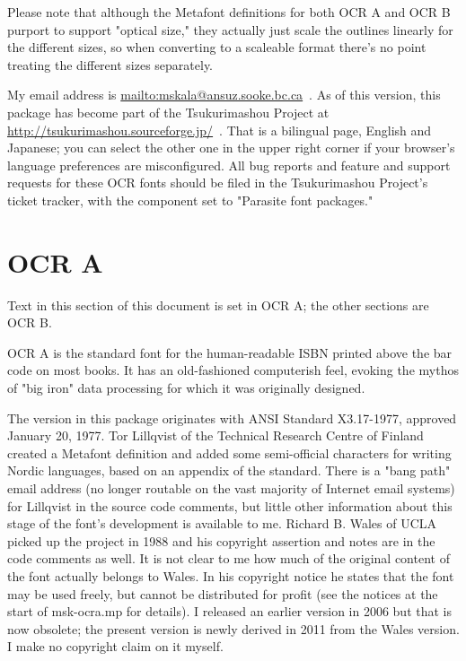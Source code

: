 \documentclass{article}
\begin{document}
Please note that although the Metafont definitions for both OCR A and OCR B
purport to support "optical size," they actually just scale the outlines
linearly for the different sizes, so when converting to a scaleable format
there's no point treating the different sizes separately.

My email address is \url{mailto:mskala@ansuz.sooke.bc.ca}~.  As of this
version, this package has become part of the Tsukurimashou Project at
\url{http://tsukurimashou.sourceforge.jp/}~.  That is a bilingual page,
English and Japanese; you can select the other one in the upper right corner
if your browser's language preferences are misconfigured.  All bug reports
and feature and support requests for these OCR fonts should be filed in the
Tsukurimashou Project's ticket tracker, with the component set to "Parasite
font packages."

\setmainfont{OCRA.otf}
\setmonofont{OCRA.otf}
\section{OCR A}

Text in this section of this document is set in OCR A; the other sections
are OCR B.

OCR A is the standard font for the human-readable ISBN printed above the bar
code on most books.  It has an old-fashioned computerish feel, evoking the
mythos of "big iron" data processing for which it was originally designed.

The version in this package originates with ANSI Standard X3.17-1977,
approved January 20, 1977.  Tor Lillqvist of the Technical Research Centre
of Finland created a Metafont definition and added some semi-official
characters for writing Nordic languages, based on an appendix of the
standard.  There is a "bang path" email address (no longer routable on the
vast majority of Internet email systems) for Lillqvist in the source code
comments, but little other information about this stage of the font's
development is available to me.  Richard B. Wales of UCLA picked up the
project in 1988 and his copyright assertion and notes are in the code
comments as well.  It is not clear to me how much of the original content of
the font actually belongs to Wales.  In his copyright notice he states that
the font may be used freely, but cannot be distributed for profit (see the
notices at the start of msk-ocra.mp for details).
I released an earlier version in 2006
but that is now obsolete; the present version is newly derived in 2011 from
the Wales version.  I make no copyright claim on it myself.
\end{document}
